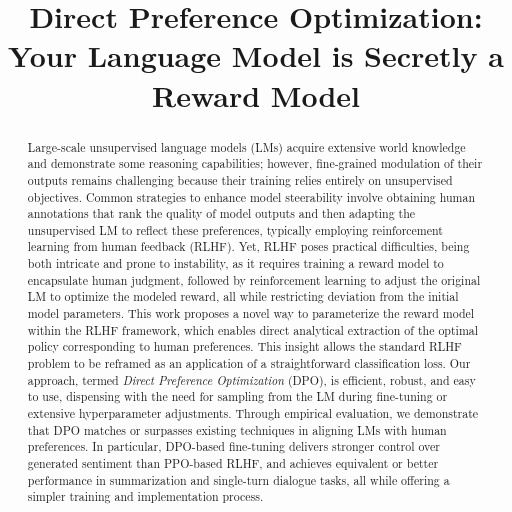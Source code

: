 \title{Direct Preference Optimization: Your Language Model is Secretly a Reward Model}

\begin{abstract}
Large-scale unsupervised language models (LMs) acquire extensive world knowledge and demonstrate some reasoning capabilities; however, fine-grained modulation of their outputs remains challenging because their training relies entirely on unsupervised objectives. Common strategies to enhance model steerability involve obtaining human annotations that rank the quality of model outputs and then adapting the unsupervised LM to reflect these preferences, typically employing reinforcement learning from human feedback (RLHF). Yet, RLHF poses practical difficulties, being both intricate and prone to instability, as it requires training a reward model to encapsulate human judgment, followed by reinforcement learning to adjust the original LM to optimize the modeled reward, all while restricting deviation from the initial model parameters. This work proposes a novel way to parameterize the reward model within the RLHF framework, which enables direct analytical extraction of the optimal policy corresponding to human preferences. This insight allows the standard RLHF problem to be reframed as an application of a straightforward classification loss. Our approach, termed \textit{Direct Preference Optimization} (DPO), is efficient, robust, and easy to use, dispensing with the need for sampling from the LM during fine-tuning or extensive hyperparameter adjustments. Through empirical evaluation, we demonstrate that DPO matches or surpasses existing techniques in aligning LMs with human preferences. In particular, DPO-based fine-tuning delivers stronger control over generated sentiment than PPO-based RLHF, and achieves equivalent or better performance in summarization and single-turn dialogue tasks, all while offering a simpler training and implementation process.
\end{abstract}

